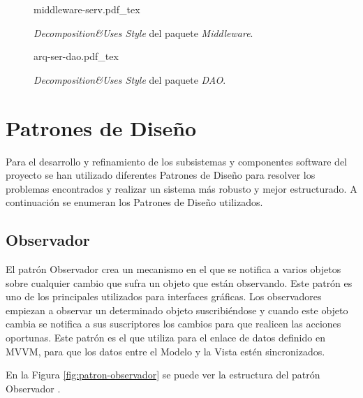  \begin{figure}[H]
    \centering
    \begin{normalsize}
        {middleware-serv.pdf_tex}
    \end{normalsize}
    \caption{\textit{Decomposition\&Uses Style} del paquete \textit{Middleware}.}
     \label{fig:arq-ser-dto}
 
 \end{figure}

 \begin{figure}[H]
    \centering
    \begin{normalsize}
        {arq-ser-dao.pdf_tex}
    \end{normalsize}
    \caption{\textit{Decomposition\&Uses Style} del paquete \textit{DAO}.}
     \label{fig:arq-ser-dao}
 
 \end{figure}




 \section{Patrones de Diseño}

 Para el desarrollo y refinamiento de los subsistemas y componentes software del proyecto se han utilizado diferentes Patrones de Diseño para resolver los problemas encontrados y realizar un sistema más robusto y mejor estructurado. A continuación se enumeran los Patrones de Diseño utilizados. 
 
 \subsection{Observador}
 El patrón Observador \cite{observador} crea un mecanismo en el que se notifica a varios objetos sobre cualquier cambio que sufra un objeto que están observando. Este patrón es uno de los principales utilizados para interfaces gráficas. Los observadores empiezan a observar un determinado objeto suscribiéndose y cuando este objeto cambia se notifica a sus suscriptores los cambios para que realicen las acciones oportunas. Este patrón es el que utiliza para el enlace de datos definido en MVVM, para que los datos entre el Modelo y la Vista estén sincronizados.
 
 En la Figura \ref{fig:patron-observador} se puede ver la estructura del patrón Observador \cite{yania}.
 
